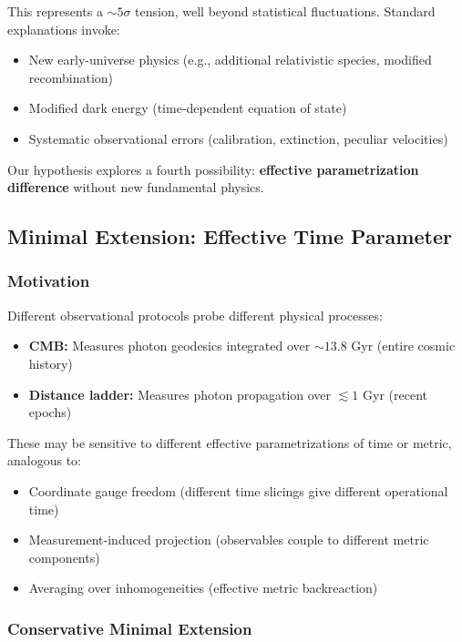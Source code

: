 This represents a $\sim 5\sigma$ tension, well beyond statistical fluctuations. Standard explanations invoke:
\begin{itemize}
    \item New early-universe physics (e.g., additional relativistic species, modified recombination)
    \item Modified dark energy (time-dependent equation of state)
    \item Systematic observational errors (calibration, extinction, peculiar velocities)
\end{itemize}

Our hypothesis explores a fourth possibility: \textbf{effective parametrization difference} without new fundamental physics.

\subsection{Minimal Extension: Effective Time Parameter}

\subsubsection{Motivation}

Different observational protocols probe different physical processes:
\begin{itemize}
    \item \textbf{CMB:} Measures photon geodesics integrated over $\sim 13.8$ Gyr (entire cosmic history)
    \item \textbf{Distance ladder:} Measures photon propagation over $\lesssim 1$ Gyr (recent epochs)
\end{itemize}

These may be sensitive to different effective parametrizations of time or metric, analogous to:
\begin{itemize}
    \item Coordinate gauge freedom (different time slicings give different operational time)
    \item Measurement-induced projection (observables couple to different metric components)
    \item Averaging over inhomogeneities (effective metric backreaction)
\end{itemize}

\subsubsection{Conservative Minimal Extension}

